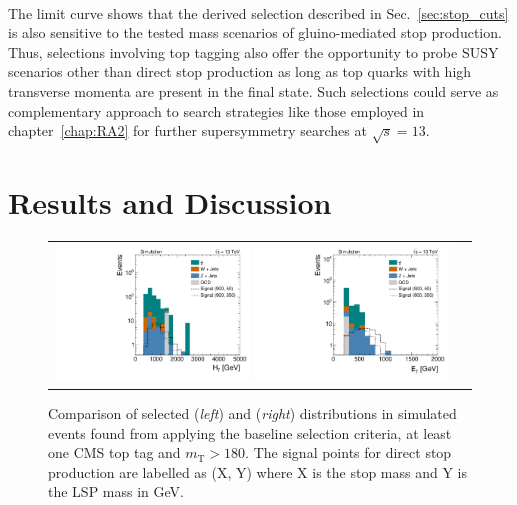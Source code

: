\\
The limit curve shows that the derived selection described in Sec.~\ref{sec:stop_cuts} is also sensitive to the tested mass scenarios of gluino-mediated stop production. Thus, selections involving top tagging also offer the opportunity to probe SUSY scenarios other than direct stop production as long as top quarks with high transverse momenta are present in the final state. Such selections could serve as complementary approach to search strategies like those employed in chapter~\ref{chap:RA2} for further supersymmetry searches at $\sqrt{s} = 13$\tev. 

\section{Results and Discussion}
\label{sec:stop_results}
\begin{figure}[!t]
  \centering
  \begin{tabular}{cc}
   
      \includegraphics[width=0.49\textwidth]{figures/Stop_TopTagTransverseMass_HThad_HighLSPMass.pdf}  
      \includegraphics[width=0.49\textwidth]{figures/Stop_TopTagTransverseMass_MET_HighLSPMass.pdf} 
    \end{tabular}
 
  \caption{Comparison of selected \HT (\textit{left}) and \met (\textit{right}) distributions in simulated events found from applying the baseline selection criteria, at least one CMS top tag and $m_\mathrm{T} > 180$\gev. The signal points for direct stop production are labelled as (X, Y) where X is the stop mass and Y is the LSP mass in GeV.}
  \label{fig:stop_highLSP_ht_met}
\end{figure}
